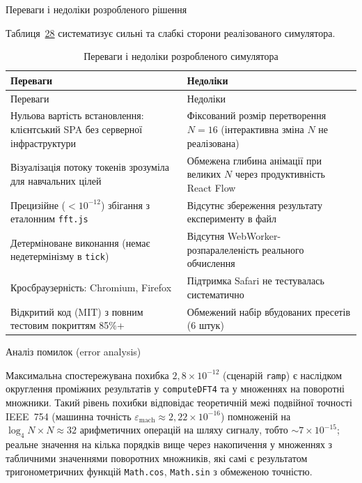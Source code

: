 Переваги і недоліки розробленого рішення

Таблиця~\hyperref[tab:pros_cons]{28} систематизує сильні та слабкі
сторони реалізованого симулятора.

\begin{longtable}[]{@{}
  >{\raggedright\arraybackslash}p{}
  >{\raggedright\arraybackslash}p{}@{}}
\caption{\protect{}\label{tab:pros_cons}{}Переваги і
недоліки розробленого симулятора}\tabularnewline
\toprule\noalign{}
\begin{minipage}[b]{\linewidth}\raggedright
Переваги
\end{minipage} & \begin{minipage}[b]{\linewidth}\raggedright
Недоліки
\end{minipage} \\
\midrule\noalign{}
\endfirsthead
\toprule\noalign{}
\begin{minipage}[b]{\linewidth}\raggedright
Переваги
\end{minipage} & \begin{minipage}[b]{\linewidth}\raggedright
Недоліки
\end{minipage} \\
\midrule\noalign{}
\endhead
\bottomrule\noalign{}
\endlastfoot
Нульова вартість встановлення: клієнтський SPA без серверної
інфраструктури & Фіксований розмір перетворення \(N = 16\) (інтерактивна
зміна \(N\) не реалізована) \\
Візуалізація потоку токенів зрозуміла для навчальних цілей & Обмежена
глибина анімації при великих \(N\) через продуктивність React Flow \\
Прецизійне (\(< 10^{- 12}\)) збігання з еталонним \texttt{fft.js} &
Відсутнє збереження результату експерименту в файл \\
Детерміноване виконання (немає недетермінізму в \texttt{tick}) &
Відсутня WebWorker-розпаралеленість реального обчислення \\
Кросбраузерність: Chromium, Firefox & Підтримка Safari не тестувалась
систематично \\
Відкритий код (MIT) з повним тестовим покриттям 85\%+ & Обмежений набір
вбудованих пресетів (6 штук) \\
\end{longtable}

Аналіз помилок (error analysis)

Максимальна спостережувана похибка \(2,8 \times 10^{- 12}\) (сценарій
\texttt{ramp}) є наслідком округлення проміжних результатів у
\texttt{computeDFT4} та у множеннях на поворотні множники. Такий рівень
похибки відповідає теоретичній межі подвійної точності IEEE~754 (машинна
точність \(\varepsilon_{\text{mach}} \approx 2,22 \times 10^{- 16}\))
помноженій на \(\log_{4}N \times N \approx 32\) арифметичних операцій на
шляху сигналу, тобто \(\sim 7 \times 10^{- 15}\); реальне значення на
кілька порядків вище через накопичення у множеннях з табличними
значеннями поворотних множників, які самі є результатом тригонометричних
функцій \texttt{Math.cos}, \texttt{Math.sin} з обмеженою точністю.

